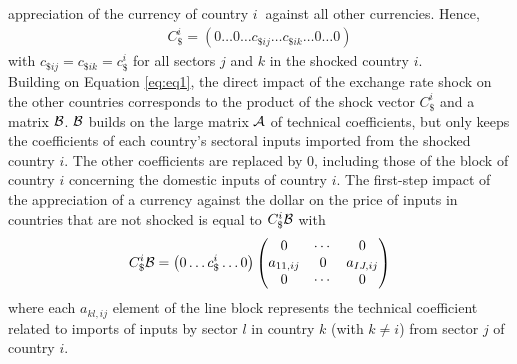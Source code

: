\documentclass[11pt,a4paper]{article}
\begin{document}
appreciation of the currency of country $i~$ against all other currencies.
Hence,
\begin{eqnarray*}
C_\$^i=\left(0\ldots0\ldots c_{\$ij}\ldots c_{\$ik}\dots 0\ldots0\right)
\end{eqnarray*}
with $c_{\$ij}=c_{\$ik}=c_\$^i
$
for all sectors $j$ and $k$ in the shocked country $i$.\\
Building on Equation \ref{eq:eq1}, the direct impact of the exchange rate shock on the other countries corresponds to the product of the shock vector $C_\$^i$ and a matrix ${\cal B}$. 
${\cal B}$ builds on the large matrix ${\cal A}$ of technical coefficients, but only keeps the coefficients of each country's sectoral inputs imported from the shocked country $i$. The other coefficients are replaced by 0, including those of the block of country $i$ concerning the domestic inputs of country $i$. 
The first-step impact of the appreciation of a currency against the dollar on the price of inputs in countries that are not shocked is equal to $C_\$^i{\cal B}$ with
\begin{eqnarray}
C_\$^i{\cal B}=\left(0\ldots c_\$^i \ldots 0\right)\left(\begin{matrix}0&\cdots&0\\a_{11,ij}&0&a_{IJ,ij}\\0&\cdots&0\\\end{matrix}\right) 	
\label{eq:eq3}
\end{eqnarray}
where each $a_{kl,ij}$ element of the line block represents the technical coefficient related to imports of inputs by sector $l$ in country $k$ (with $k\ne i$) from sector $j$ of country $i$.\\
\end{document}
